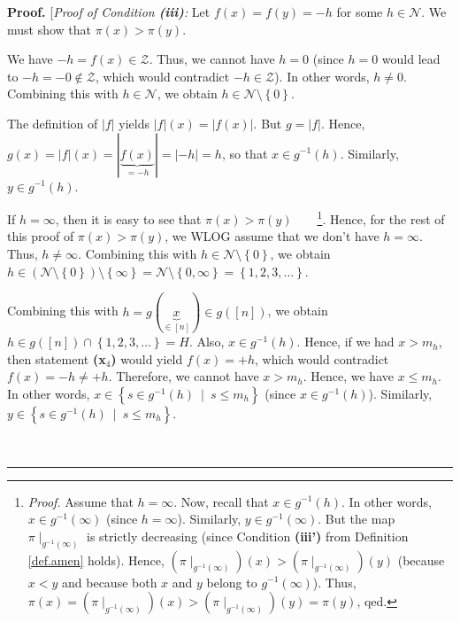 \documentclass[numbers=enddot,12pt,final,onecolumn,notitlepage]{scrartcl}%
\theoremstyle{definition}
\newenvironment{proof}[1][Proof]{\noindent\textbf{#1.} }{\ \rule{0.5em}{0.5em}}
\newenvironment{verlong}{}{}
\begin{document}
\begin{verlong}
\begin{proof}
[\textit{Proof of Condition \textbf{(iii)}:} Let $f\left(  x\right)  =f\left(
y\right)  =-h$ for some $h\in\mathcal{N}$. We must show that $\pi\left(
x\right)  >\pi\left(  y\right)  $.

We have $-h=f\left(  x\right)  \in\mathcal{Z}$. Thus, we cannot have $h=0$
(since $h=0$ would lead to $-h=-0\notin\mathcal{Z}$, which would contradict
$-h\in\mathcal{Z}$). In other words, $h\neq0$.
Combining this with $h\in\mathcal{N}$, we obtain
$h\in\mathcal{N}\setminus\left\{  0\right\}  $.

The definition of $\left\vert f\right\vert $ yields $\left\vert f\right\vert
\left(  x\right)  =\left\vert f\left(  x\right)  \right\vert $. But
$g=\left\vert f\right\vert $. Hence, $g\left(  x\right)  =\left\vert
f\right\vert \left(  x\right)  =\left\vert \underbrace{f\left(  x\right)
}_{=-h}\right\vert =\left\vert -h\right\vert =h$, so that $x\in g^{-1}\left(
h\right)  $. Similarly, $y\in g^{-1}\left(  h\right)  $.

If $h=\infty$, then it is easy to see that $\pi\left(  x\right)  >\pi\left(
y\right)  $\ \ \ \ \footnote{\textit{Proof.} Assume that $h=\infty$. Now,
recall that $x\in g^{-1}\left(  h\right)  $. In other words, $x\in
g^{-1}\left(  \infty\right)  $ (since $h=\infty$). Similarly, $y\in
g^{-1}\left(  \infty\right)  $. But the map $\pi\mid_{g^{-1}\left(
\infty\right)  }$ is strictly decreasing (since Condition \textbf{(iii')} from
Definition \ref{def.amen} holds). Hence, $\left(  \pi\mid_{g^{-1}\left(
\infty\right)  }\right)  \left(  x\right)  >\left(  \pi\mid_{g^{-1}\left(
\infty\right)  }\right)  \left(  y\right)  $ (because $x<y$ and because both
$x$ and $y$ belong to $g^{-1}\left(  \infty\right)  $). Thus, $\pi\left(
x\right)  =\left(  \pi\mid_{g^{-1}\left(  \infty\right)  }\right)  \left(
x\right)  >\left(  \pi\mid_{g^{-1}\left(  \infty\right)  }\right)  \left(
y\right)  =\pi\left(  y\right)  $, qed.}. Hence, for the rest of this proof of
$\pi\left(  x\right)  >\pi\left(  y\right)  $, we WLOG assume that we don't
have $h=\infty$. Thus, $h\neq\infty$. Combining this with $h\in\mathcal{N}%
\setminus\left\{  0\right\}  $, we obtain $h\in\left(  \mathcal{N}%
\setminus\left\{  0\right\}  \right)  \setminus\left\{  \infty\right\}
=\mathcal{N}\setminus\left\{  0,\infty\right\}  =\left\{  1,2,3,\ldots
\right\}  $.

Combining this with $h=g\left(  \underbrace{x}_{\in\left[  n\right]  }\right)
\in g\left(  \left[  n\right]  \right)  $, we obtain $h\in g\left(  \left[
n\right]  \right)  \cap\left\{  1,2,3,\ldots\right\}  =H$. Also, $x\in
g^{-1}\left(  h\right)  $. Hence, if we had $x>m_{h}$, then statement
\textbf{(x}$_{4}$\textbf{)} would yield $f\left(  x\right)  =+h$, which would
contradict $f\left(  x\right)  =-h\neq+h$. Therefore, we cannot have $x>m_{h}%
$. Hence, we have $x\leq m_{h}$. In other words, $x\in\left\{  s\in
g^{-1}\left(  h\right)  \ \mid\ s\leq m_{h}\right\}  $ (since $x\in
g^{-1}\left(  h\right)  $). Similarly, $y\in\left\{  s\in g^{-1}\left(
h\right)  \ \mid\ s\leq m_{h}\right\}  $.


\end{proof}
\end{verlong}
\end{document}

